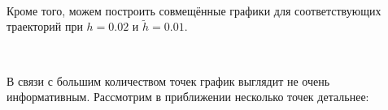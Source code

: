 \documentclass[14pt,a4paper]{scrartcl}
\begin{document}
\begin{figure}[H]
\begin{minipage}[h]{.7\linewidth}
	\end{minipage}
	\begin{minipage}[h]{.7\linewidth}
		  \\
	\end{minipage}
\end{figure}


\pagebreak

Кроме того, можем построить совмещённые графики для соответствующих траекторий при $h = 0.02$ и $\tilde{h} = 0.01$.

\begin{figure}[H]
	\begin{minipage}[h]{1\linewidth}
		  \\
	\end{minipage}
\end{figure}



В связи с большим количеством точек график выглядит не очень информативным. Рассмотрим в приближении несколько точек детальнее:
\end{document}
